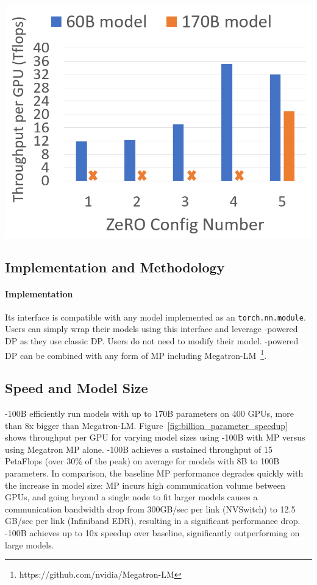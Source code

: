 \begin{table}
\begin{minipage}[b]{0.30\columnwidth}
       \includegraphics[width=\textwidth]{tput_vs_config.PNG}
         \label{fig:max-performance}
   \end{minipage}
   \end{table}
  
\subsection{Implementation and Methodology}

\paragraph{Implementation}
Its interface is compatible with any model implemented as an {\tt torch.nn.module}. Users can simply wrap their models using this interface and leverage \name-powered DP as they use classic DP. Users do not need to modify their model.  \name-powered DP can be combined with any form of MP including Megatron-LM~\footnote{https://github.com/nvidia/Megatron-LM}.

\subsection{Speed and Model Size}
\name-100B efficiently run models with up to 170B parameters on 400 GPUs, more than 8x bigger than Megatron-LM. Figure~\ref{fig:billion_parameter_speedup} shows throughput per GPU for varying model sizes using \name-100B with MP versus using Megatron MP alone. \name-100B achieves a sustained throughput of 15 PetaFlops (over 30\% of the peak) on average for models with 8B to 100B parameters. In comparison, the baseline MP performance degrades quickly with the increase in model size: MP incurs high communication volume between GPUs, and going beyond a single node to fit larger models causes a communication bandwidth drop from 300GB/sec per link (NVSwitch) to 12.5 GB/sec per link (Infiniband EDR), resulting in a significant performance drop. \name-100B achieves up to 10x speedup over baseline, significantly outperforming on large models.

